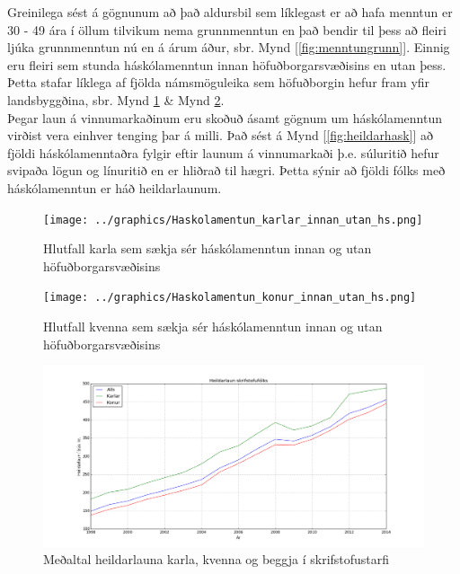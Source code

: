 \documentclass[12pt, git, draft]{rureport}
\begin{document}
Greinilega sést á gögnunum að það aldursbil sem líklegast er að hafa menntun er 30 - 49 ára í öllum tilvikum nema grunnmenntun en það bendir til þess að fleiri ljúka grunnmenntun nú en á árum áður, sbr. Mynd [\ref{fig:menntungrunn}]. Einnig eru fleiri sem stunda háskólamenntun innan höfuðborgarsvæðisins en utan þess. Þetta stafar líklega af fjölda námsmöguleika sem höfuðborgin hefur fram yfir landsbyggðina, sbr.  Mynd \ref{fig:menntukarla} \& Mynd \ref{fig:menntunkonur}.\\

Þegar laun á vinnumarkaðinum eru skoðuð ásamt gögnum um háskólamenntun virðist vera einhver tenging þar á milli. Það sést á Mynd [\ref{fig:heildarhask}] að fjöldi háskólamenntaðra fylgir eftir launum á vinnumarkaði þ.e. súluritið hefur svipaða lögun og línuritið en er hliðrað til hægri. Þetta sýnir að fjöldi fólks með háskólamenntun er háð heildarlaunum.

\pagebreak

\begin{figure}
	\centering 
	\texttt{[image: ../graphics/Haskolamentun\_karlar\_innan\_utan\_hs.png]}
	\caption{Hlutfall karla sem sækja sér háskólamenntun innan og utan höfuðborgarsvæðisins \label{fig:menntukarla}}
\end{figure}

\begin{figure}
	\centering 
	\texttt{[image: ../graphics/Haskolamentun\_konur\_innan\_utan\_hs.png]}
	\caption{Hlutfall kvenna sem sækja sér háskólamenntun innan og utan höfuðborgarsvæðisins\label{fig:menntunkonur}}
\end{figure}

\begin{figure}
	\centering 
	\includegraphics[width=\textwidth]{graphics/heildar_laun.png}
	\caption{Meðaltal heildarlauna karla, kvenna og beggja í skrifstofustarfi \label{fig:heildarlaun}}
\end{figure}
\end{document}
